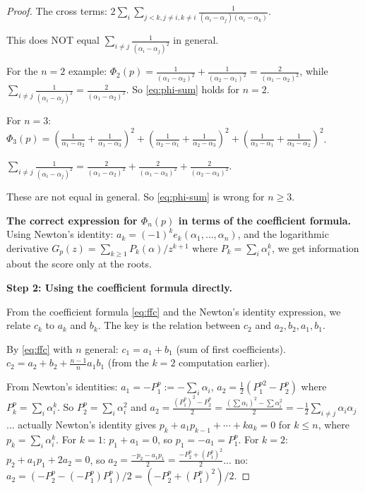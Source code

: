 \documentclass[12pt]{article}
\theoremstyle{definition}
\begin{document}
\begin{proof}
The cross terms: $2\sum_i\sum_{j<k,j\neq i,k\neq i}\frac{1}{(\alpha_i-\alpha_j)(\alpha_i-\alpha_k)}$.

This does NOT equal $\sum_{i\neq j}\frac{1}{(\alpha_i-\alpha_j)^2}$ in general.

For the $n=2$ example: $\Phi_2(p)=\frac{1}{(\alpha_1-\alpha_2)^2}+\frac{1}{(\alpha_2-\alpha_1)^2}=\frac{2}{(\alpha_1-\alpha_2)^2}$, while $\sum_{i\neq j}\frac{1}{(\alpha_i-\alpha_j)^2}=\frac{2}{(\alpha_1-\alpha_2)^2}$. So \eqref{eq:phi-sum} holds for $n=2$.

For $n=3$: $\Phi_3(p)=(\frac{1}{\alpha_1-\alpha_2}+\frac{1}{\alpha_1-\alpha_3})^2+(\frac{1}{\alpha_2-\alpha_1}+\frac{1}{\alpha_2-\alpha_3})^2+(\frac{1}{\alpha_3-\alpha_1}+\frac{1}{\alpha_3-\alpha_2})^2$.

$\sum_{i\neq j}\frac{1}{(\alpha_i-\alpha_j)^2}=\frac{2}{(\alpha_1-\alpha_2)^2}+\frac{2}{(\alpha_1-\alpha_3)^2}+\frac{2}{(\alpha_2-\alpha_3)^2}$.

These are not equal in general.  So \eqref{eq:phi-sum} is wrong for $n\ge 3$.

\textbf{The correct expression for $\Phi_n(p)$ in terms of the coefficient formula.}
Using Newton's identity: $a_k=(-1)^k e_k(\alpha_1,\ldots,\alpha_n)$,  and the logarithmic
derivative $G_p(z)=\sum_{k\ge 1}P_k(\alpha)/z^{k+1}$ where $P_k=\sum_i\alpha_i^k$, we get
information about the score only at the roots.

\textbf{Step 2: Using the coefficient formula directly.}

From the coefficient formula \eqref{eq:ffc} and the Newton's identity expression, we relate
$c_k$ to $a_k$ and $b_k$.  The key is the relation between $c_2$ and $a_2, b_2, a_1, b_1$.

By \eqref{eq:ffc} with $n$ general:
$c_1=a_1+b_1$ (sum of first coefficients).
$c_2=a_2+b_2+\frac{n-1}{n}a_1b_1$ (from the $k=2$ computation earlier).

From Newton's identities: $a_1=-P_1^p:=-\sum_i\alpha_i$, $a_2=\frac{1}{2}(P_1^{p2}-P_2^p)$
where $P_k^p=\sum_i\alpha_i^k$.  So $P_2^p=\sum_i\alpha_i^2$ and
$a_2=\frac{(P_1^p)^2-P_2^p}{2}=\frac{(\sum\alpha_i)^2-\sum\alpha_i^2}{2}=-\frac{1}{2}\sum_{i\neq j}\alpha_i\alpha_j$... actually Newton's identity gives $p_k+a_1p_{k-1}+\cdots+ka_k=0$ for $k\le n$, where $p_k=\sum_i\alpha_i^k$.  For $k=1$: $p_1+a_1=0$, so $p_1=-a_1=P_1^p$.  For $k=2$: $p_2+a_1p_1+2a_2=0$, so $a_2=\frac{-p_2-a_1p_1}{2}=\frac{-P_2^p+(P_1^p)^2}{2}$... no: $a_2=(-P_2^p-(-P_1^p)P_1^p)/2=(-P_2^p+(P_1^p)^2)/2$.


\end{proof}
\end{document}
